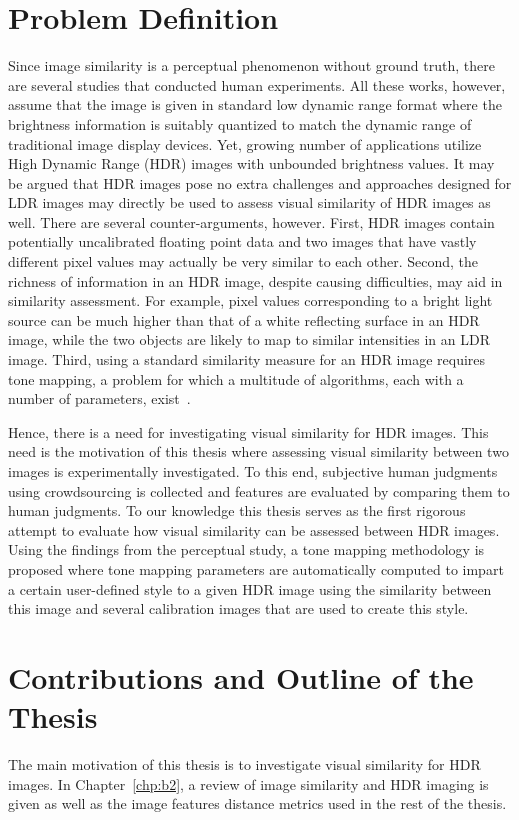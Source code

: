 \section{ Problem Definition}
Since image similarity is a perceptual phenomenon without ground truth, there are several studies that conducted human experiments. All these works, however, assume that the image is given in standard low dynamic range format where the brightness information is suitably quantized to match the dynamic range of traditional image display devices. Yet, growing number of applications utilize High Dynamic Range (HDR) images with unbounded brightness values. It may be argued that HDR images pose no extra challenges and approaches designed for LDR images may directly be used to assess visual similarity of HDR images as well. There are several counter-arguments, however. First, HDR images contain potentially uncalibrated floating point data and two images that have vastly different pixel values may actually be very similar to each other. Second, the richness of information in an HDR image, despite causing difficulties, may aid in similarity assessment. For example, pixel values corresponding to a bright light source can be much higher than that of a white reflecting surface in an HDR image, while the two objects are likely to map to similar intensities in an LDR image. Third, using a standard similarity measure for an HDR image requires tone mapping, a problem for which a multitude of algorithms, each with a number of parameters, exist~\cite{yeganeh2012objective}.

Hence, there is a need for investigating visual similarity for HDR images. This need is the motivation of this thesis where assessing visual similarity between two images is experimentally investigated. To this end, subjective human judgments using crowdsourcing is collected and features are evaluated by comparing them to human judgments. To our knowledge this thesis serves as the first rigorous attempt to evaluate how visual similarity can be assessed between HDR images. Using the findings from the perceptual study, a tone mapping methodology is proposed where tone mapping parameters are automatically computed to impart a certain user-defined style to a given HDR image using the similarity between this image and several calibration images that are used to create this style.

\section{Contributions and Outline of the Thesis}
The main motivation of this thesis is to investigate visual similarity for HDR images. In Chapter~\ref{chp:b2}, a review of image similarity and HDR imaging is given as well as the image features distance metrics used in the rest of the thesis.

